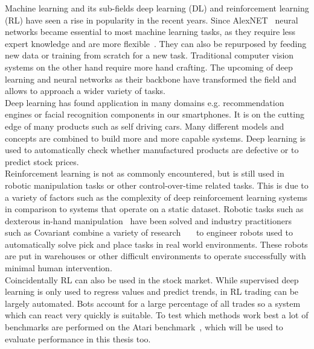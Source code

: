 \documentclass{article}
\begin{document}
Machine learning and its sub-fields deep learning (DL) and reinforcement learning (RL) have seen
a rise in popularity in the recent years.
Since AlexNET~\cite{NIPS2012_c399862d} neural networks became essential to
most machine learning tasks, as they require less expert knowledge and are
more flexible~\cite{DBLP:journals/corr/abs-1910-13796}. They can also be
repurposed by feeding new data or training from scratch for a new task.
Traditional computer vision systems on the other hand require more hand crafting. 
The upcoming of deep learning and neural networks as their backbone have transformed the field and allows to approach
a wider variety of tasks.\\
Deep learning has found application in many domains e.g. recommendation engines or facial recognition components in our smartphones.
It is on the cutting edge of many products such as self driving cars. Many different models and concepts
are combined to build more and more capable systems. Deep learning is used to automatically check whether manufactured
products are defective or to predict stock prices.\\
Reinforcement learning is not as commonly encountered, but is still used in robotic manipulation tasks or other
control-over-time related tasks. This is due to a variety of factors such as the complexity of deep reinforcement learning
systems in comparison to systems that operate on a static dataset.
Robotic tasks such as dexterous in-hand manipulation~\cite{DBLP:journals/corr/abs-1808-00177}
have been solved and industry practitioners such as Covariant combine a variety of
research~\cite{DBLP:journals/corr/abs-1710-04615}~\cite{Li2020Sub-policy}~\cite{DBLP:journals/corr/abs-1803-05268}
to engineer robots used to automatically solve pick and place tasks in real world environments.
These robots are put in warehouses or other difficult environments to operate successfully with minimal
human intervention.\\
Coincidentally RL can also be used in the stock market. While supervised deep learning is only used to regress
values and predict trends, in RL trading can be largely automated. Bots account for a large percentage of all trades so
a system which can react very quickly is suitable.
To test which methods work best a lot of benchmarks are performed on the Atari benchmark~\cite{DBLP:journals/corr/abs-1207-4708},
which will be used to evaluate performance in this thesis too.\\
\end{document}

